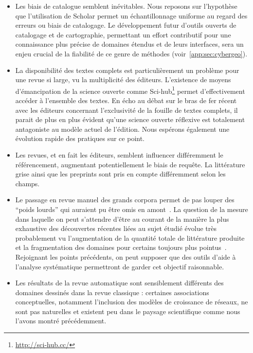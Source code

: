 \begin{itemize}
\item Les biais de catalogue semblent inévitables. Nous reposons sur l'hypothèse que l'utilisation de Scholar permet un échantillonnage uniforme au regard des erreurs ou biais de catalogage. Le développement futur d'outils ouverts de catalogage et de cartographie, permettant un effort contributif pour une connaissance plus précise de domaines étendus et de leurs interfaces, sera un enjeu crucial de la fiabilité de ce genre de méthodes (voir~\ref{app:sec:cybergeo}).
\item La disponibilité des textes complets est particulièrement un problème pour une revue si large, vu la multiplicité des éditeurs. L'existence de moyens d'émancipation de la science ouverte comme Sci-hub\footnote{\url{http://sci-hub.cc/}} permet d'effectivement accéder à l'ensemble des textes. En écho au débat sur le bras de fer récent avec les éditeurs concernant l'exclusivité de la fouille de textes complets, il parait de plus en plus évident qu'une science ouverte réflexive est totalement antagoniste au modèle actuel de l'édition. Nous espérons également une évolution rapide des pratiques sur ce point.
\item Les revues, et en fait les éditeurs, semblent influencer différemment le référencement, augmentant potentiellement le biais de requête. La littérature grise ainsi que les preprints sont pris en compte différemment selon les champs.
\item Le passage en revue manuel des grands corpora permet de pas louper des ``poids lourds'' qui auraient pu être omis en amont~\cite{lissacksubliminal}. La question de la mesure dans laquelle on peut s'attendre d'être au courant de la manière la plus exhaustive des découvertes récentes liées au sujet étudié évolue très probablement vu l'augmentation de la quantité totale de littérature produite et la fragmentation des domaines pour certains toujours plus pointus~\cite{bastian2010seventy}. Rejoignant les points précédents, on peut supposer que des outils d'aide à l'analyse systématique permettront de garder cet objectif raisonnable.
\item Les résultats de la revue automatique sont sensiblement différents des domaines dessinés dans la revue classique : certaines associations conceptuelles, notamment l'inclusion des modèles de croissance de réseaux, ne sont pas naturelles et existent peu dans le paysage scientifique comme nous l'avons montré précédemment.
\end{itemize}


